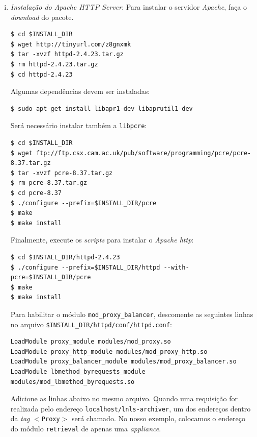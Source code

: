 \begin {enumerate}[i.]
\item \textit{Instalação do Apache HTTP Server}: Para instalar o servidor
\textit{Apache}, faça o \textit{download} do pacote. 

\begin{lstlisting}[keywordstyle=\ttfamily, style=nonumbers]
$ cd $INSTALL_DIR
$ wget http://tinyurl.com/z8gnxmk
$ tar -xvzf httpd-2.4.23.tar.gz
$ rm httpd-2.4.23.tar.gz
$ cd httpd-2.4.23
\end{lstlisting}

Algumas dependências devem ser instaladas:

\begin{lstlisting}[keywordstyle=\ttfamily, style=nonumbers]
$ sudo apt-get install libapr1-dev libaprutil1-dev
\end{lstlisting}

Será necessário instalar também a \texttt{libpcre}:

\begin{lstlisting}[keywordstyle=\ttfamily, style=nonumbers]
$ cd $INSTALL_DIR
$ wget ftp://ftp.csx.cam.ac.uk/pub/software/programming/pcre/pcre-8.37.tar.gz
$ tar -xvzf pcre-8.37.tar.gz
$ rm pcre-8.37.tar.gz
$ cd pcre-8.37
$ ./configure --prefix=$INSTALL_DIR/pcre
$ make
$ make install
\end{lstlisting}

Finalmente, execute os \textit{scripts} para instalar o \textit{Apache http}:

\begin{lstlisting}[keywordstyle=\ttfamily, style=nonumbers]
$ cd $INSTALL_DIR/httpd-2.4.23
$ ./configure --prefix=$INSTALL_DIR/httpd --with-pcre=$INSTALL_DIR/pcre
$ make
$ make install
\end{lstlisting}

Para habilitar o módulo \texttt{mod\_proxy\_balancer}, descomente as seguintes
linhas no arquivo \texttt{\$INSTALL\_DIR/httpd/conf/httpd.conf}:

\begin{lstlisting}[keywordstyle=\ttfamily, style=nonumbers]
LoadModule proxy_module modules/mod_proxy.so
LoadModule proxy_http_module modules/mod_proxy_http.so
LoadModule proxy_balancer_module modules/mod_proxy_balancer.so
LoadModule lbmethod_byrequests_module modules/mod_lbmethod_byrequests.so
\end{lstlisting}

Adicione as linhas abaixo no mesmo arquivo. Quando uma requisição for realizada
pelo endereço \texttt{localhost/lnls-archiver}, um dos endereços dentro da
\textit{tag} \texttt{\(<\)Proxy\(>\)} será chamado. No nosso exemplo, colocamos
o endereço do módulo \texttt{retrieval} de apenas uma \textit{appliance}.


\end{enumerate}
